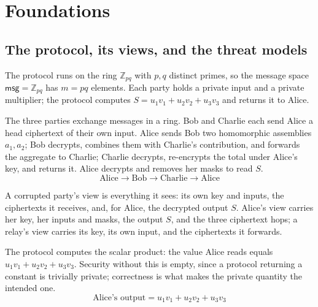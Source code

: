\part{Foundations}

\chapter{The protocol, its views, and the threat models}

The protocol runs on the ring $\mathbb{Z}_{pq}$ with $p,q$ distinct primes, so the
message space $\mathsf{msg} = \mathbb{Z}_{pq}$ has $m = pq$ elements. Each party
holds a private input and a private multiplier; the protocol computes
$S = u_1 v_1 + u_2 v_2 + u_3 v_3$ and returns it to Alice.

\begin{definition}
  \label{def:protocol_flow}
  \rocqok
  The three parties exchange messages in a ring. Bob and Charlie each send Alice a
  head ciphertext of their own input. Alice sends Bob two homomorphic assemblies
  $a_1, a_2$; Bob decrypts, combines them with Charlie's contribution, and
  forwards the aggregate to Charlie; Charlie decrypts, re-encrypts the total under
  Alice's key, and returns it. Alice decrypts and removes her masks to read $S$.
  \[ \text{Alice} \to \text{Bob} \to \text{Charlie} \to \text{Alice} \]
\end{definition}

\begin{definition}
  \label{def:party_views}
  \rocqok
  A corrupted party's view is everything it sees: its own key and inputs, the
  ciphertexts it receives, and, for Alice, the decrypted output $S$. Alice's view
  carries her key, her inputs and masks, the output $S$, and the three ciphertext
  hops; a relay's view carries its key, its own input, and the ciphertexts it
  forwards.
\end{definition}

\begin{lemma}
  \label{lem:dsdp_is_correct}
  \rocqok
  The protocol computes the scalar product: the value Alice reads equals
  $u_1 v_1 + u_2 v_2 + u_3 v_3$. Security without this is empty, since a protocol
  returning a constant is trivially private; correctness is what makes the private
  quantity the intended one.
  \[ \text{Alice's output} = u_1 v_1 + u_2 v_2 + u_3 v_3 \]
\end{lemma}

